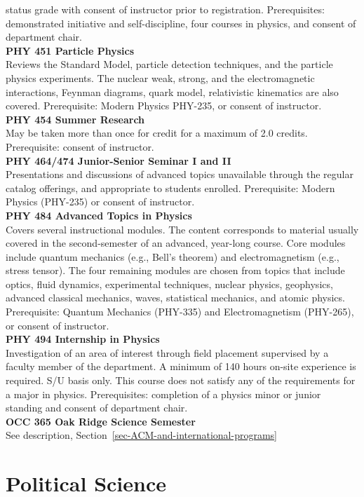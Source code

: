 \documentclass[
  letterpaper,
]{scrbook}
\begin{document}
status grade with consent of instructor prior to registration.
Prerequisites: demonstrated initiative and self-discipline, four courses
in physics, and consent of department chair.\\
\textbf{PHY 451 Particle Physics}\\
Reviews the Standard Model, particle detection techniques, and the
particle physics experiments. The nuclear weak, strong, and the
electromagnetic interactions, Feynman diagrams, quark model,
relativistic kinematics are also covered. Prerequisite: Modern Physics
PHY-235, or consent of instructor.\\
\textbf{PHY 454 Summer Research}\\
May be taken more than once for credit for a maximum of 2.0 credits.
Prerequisite: consent of instructor.\\
\textbf{PHY 464/474 Junior-Senior Seminar I and II}\\
Presentations and discussions of advanced topics unavailable through the
regular catalog offerings, and appropriate to students enrolled.
Prerequisite: Modern Physics (PHY-235) or consent of instructor.\\
\textbf{PHY 484 Advanced Topics in Physics}\\
Covers several instructional modules. The content corresponds to
material usually covered in the second-semester of an advanced,
year-long course. Core modules include quantum mechanics (e.g., Bell's
theorem) and electromagnetism (e.g., stress tensor). The four remaining
modules are chosen from topics that include optics, fluid dynamics,
experimental techniques, nuclear physics, geophysics, advanced classical
mechanics, waves, statistical mechanics, and atomic physics.
Prerequisite: Quantum Mechanics (PHY-335) and Electromagnetism
(PHY-265), or consent of instructor.\\
\textbf{PHY 494 Internship in Physics}\\
Investigation of an area of interest through field placement supervised
by a faculty member of the department. A minimum of 140 hours on-site
experience is required. S/U basis only. This course does not satisfy any
of the requirements for a major in physics. Prerequisites: completion of
a physics minor or junior standing and consent of department chair.\\
\textbf{OCC 365 Oak Ridge Science Semester}\\
See description, Section~\ref{sec-ACM-and-international-programs}

\section{Political Science}\label{political-science}
\end{document}
